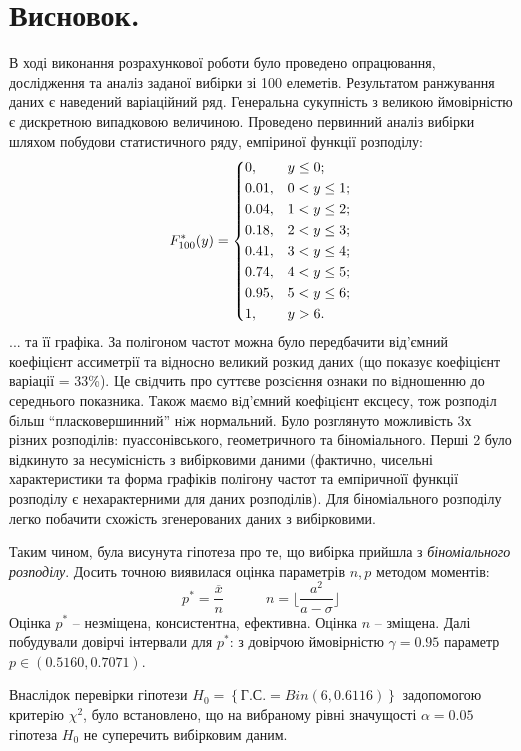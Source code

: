 \documentclass[14pt,a4paper]{scrartcl}
\theoremstyle{definition}
\theoremstyle{remark}
\theoremstyle{definition}
\theoremstyle{definition}
\begin{document}
\section{Висновок.}
В ході виконання розрахункової роботи було проведено опрацювання, дослідження та аналіз заданої вибірки зі 100 елеметів. Результатом ранжування даних є наведений варіаційний ряд. Генеральна сукупність з великою ймовірністю є дискретною випадковою величиною. Проведено первинний аналіз вибірки шляхом побудови статистичного ряду, емпіриної функції розподілу:
\[
F_{100}^* (y)= \begin{dcases}
0, &y \leq 0;\\
0.01, & 0 < y \leq 1;\\
0.04, & 1 < y \leq 2;\\
0.18, & 2 < y \leq 3;\\
0.41, & 3 < y \leq 4;\\
0.74, & 4 < y \leq 5;\\
0.95, & 5 < y \leq 6;\\
1, &  y > 6.\\
\end{dcases}
\]
... та її графіка. За полігоном частот можна було передбачити від'ємний коефіцієнт ассиметрії та відносно великий розкид даних (що показує коефіцієнт варіації = 33\%). Це свiдчить про суттєве розсiєння ознаки по вiдношенню до середнього показника. Також маємо вiд’ємний коефiцiєнт ексцесу, тож розподiл бiльш “пласковершинний” нiж нормальний. Було розглянуто можливість 3х різних розподілів: пуассонівського, геометричного та біноміального. Перші 2 було відкинуто за несумісність з вибірковими даними (фактично, чисельні характеристики та форма графіків полігону частот та емпіричноїї функції розподілу є нехарактерними для даних розподілів). Для біноміального розподілу легко побачити схожість згенерованих даних з вибірковими.\par
Таким чином, була висунута гіпотеза про те, що вибірка прийшла з \textit{біноміального розподілу}.
Досить точною виявилася оцінка параметрів \( n, p \) методом моментів:
\[
 p^* = \frac{\overline{x}}{n} \qquad \quad     n = \lfloor \frac{a^2}{a-\sigma} \rfloor
\]
Оцінка \( p^* \) -- незміщена, консистентна, ефективна. Оцінка \( n \) -- зміщена. Далі побудували довірчі інтервали для \( p^* \): з довірчою ймовірністю \( \gamma = 0.95 \) параметр \( p \in (0.5160, 0.7071) \). \par  Внаслідок перевірки гіпотези \( H_0 = {\left\lbrace \text{Г.С.} =   Bin(6, 0.6116) \right\rbrace}  \) задопомогою
критерiю \( \chi^2 \), було встановлено, що на вибраному рівні значущості \( \alpha = 0.05 \) гіпотеза \( H_0 \) не суперечить вибірковим даним.
\end{document}

